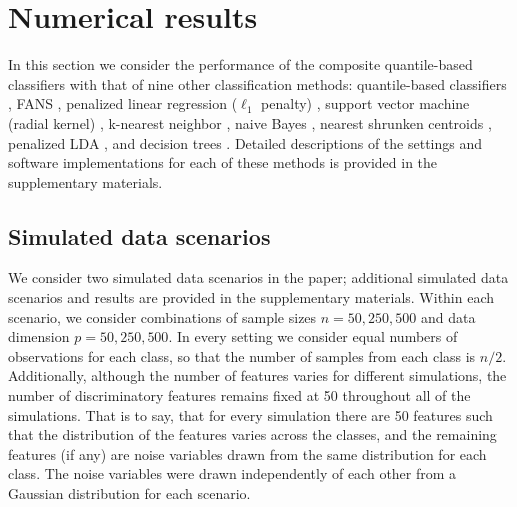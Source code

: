 

\section{Numerical results}
\label{sec:numerical-results}

In this section we consider the performance of the composite quantile-based
classifiers with that of nine other classification methods: quantile-based
classifiers \cite{hennig2016}, FANS \cite{fan2016}, penalized linear regression
($\ell_1$ penalty) \cite{park2007}, support vector machine (radial kernel)
\cite{cortes1995}, k-nearest neighbor \cite{cover1967}, naive Bayes
\cite{hastie2009}, nearest shrunken centroids \cite{tibshirani2002}, penalized
LDA \cite{witten2011}, and decision trees \cite{breiman1984}.  Detailed
descriptions of the settings and software implementations for each of these
methods is provided in the supplementary materials.


\subsection{Simulated data scenarios}
\label{sec:simulated-data-scenarios}

We consider two simulated data scenarios in the paper; additional simulated data
scenarios and results are provided in the supplementary materials.  Within each
scenario, we consider combinations of sample sizes $n = 50, 250, 500$ and data
dimension $p = 50, 250, 500$.  In every setting we consider equal numbers of
observations for each class, so that the number of samples from each class is
$n / 2$.  Additionally, although the number of features varies for different
simulations, the number of discriminatory features remains fixed at 50
throughout all of the simulations.  That is to say, that for every simulation
there are 50 features such that the distribution of the features varies across
the classes, and the remaining features (if any) are noise variables drawn from
the same distribution for each class.  The noise variables were drawn
independently of each other from a Gaussian distribution for each scenario.


